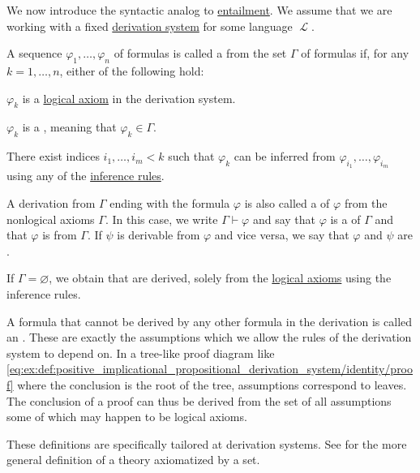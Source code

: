 \begin{definition}\label{def:derivation_system_derivability}
  We now introduce the syntactic analog to \hyperref[def:first_order_semantics/entailment]{entailment}. We assume that we are working with a fixed \hyperref[def:proof_derivation_system]{derivation system} for some language \( \mscrL \).

 A sequence \( \varphi_1, \ldots, \varphi_n \) of formulas is called a  from the set \( \Gamma \) of formulas if, for any \( k = 1, \ldots, n \), either of the following hold:
  \begin{thmenum}
     \( \varphi_k \) is a \hyperref[def:proof_derivation_system/axioms]{logical axiom} in the derivation system.

     \( \varphi_k \) is a , meaning that \( \varphi_k \in \Gamma \).

     There exist indices \( i_1, \ldots, i_m < k \) such that \( \varphi_k \) can be inferred from \( \varphi_{i_1}, \ldots, \varphi_{i_m} \) using any of the \hyperref[def:proof_derivation_system/rules]{inference rules}.
  \end{thmenum}

  A derivation from \( \Gamma \) ending with the formula \( \varphi \) is also called a  of \( \varphi \) from the nonlogical axioms \( \Gamma \). In this case, we write \( \Gamma \vdash \varphi \) and say that \( \varphi \) is a  of \( \Gamma \) and that \( \varphi \) is  from \( \Gamma \). If \( \psi \) is derivable from \( \varphi \) and vice versa, we say that \( \varphi \) and \( \psi \) are .

  If \( \Gamma = \varnothing \), we obtain  that are derived, solely from the \hyperref[def:proof_derivation_system/axioms]{logical axioms} using the inference rules.

  A formula that cannot be derived by any other formula in the derivation is called an . These are exactly the assumptions which we allow the rules of the derivation system to depend on. In a tree-like proof diagram like \eqref{eq:ex:def:positive_implicational_propositional_derivation_system/identity/proof} where the conclusion is the root of the tree, assumptions correspond to leaves. The conclusion of a proof can thus be derived from the set of all assumptions some of which may happen to be logical axioms.

  These definitions are specifically tailored at derivation systems. See  for the more general definition of a theory axiomatized by a set.
\end{definition}

